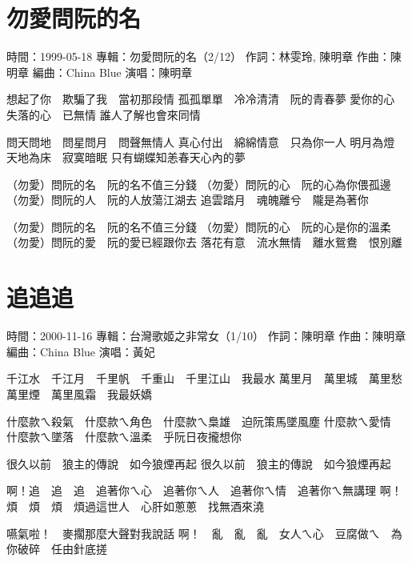\documentclass[UTF8,a4paper,oneside,twocolumn,12pt]{ctexbook}
\newcommand{\infopair}[2]{\textbullet #1：#2}
\newcommand{\zc}[1][伍佰]{\infopair{作詞}{#1}}
\newcommand{\zq}[1][伍佰]{\infopair{作曲}{#1}}
\newcommand{\bq}[1][伍佰]{\infopair{編曲}{#1}}
\newcommand{\zj}[1]{\infopair{專輯}{#1}}
\newcommand{\sj}[1]{\infopair{時間}{#1}}
\newenvironment{info}{\begin{flushleft}\kaishu
	}
	{\end{flushleft}\normalsize\yahei\par}
\newenvironment{lyric}{
	}
{}
\begin{document}
\section{勿愛問阮的名}
\begin{info}
	\sj{1999-05-18}
	\zj{勿愛問阮的名（2/12）}
	\zc[林雯玲, 陳明章]
	\zq[陳明章]
	\bq[China Blue]
	\infopair{演唱}{陳明章}
\end{info}
\begin{lyric}
	想起了你　欺騙了我　當初那段情
	孤孤單單　冷冷清清　阮的青春夢
	愛你的心　失落的心　已無情
	誰人了解也會來同情

	問天問地　問星問月　問聲無情人
	真心付出　綿綿情意　只為你一人
	明月為燈　天地為床　寂寞暗眠
	只有蝴蝶知恙春天心內的夢

	（勿愛）問阮的名　阮的名不值三分錢
	（勿愛）問阮的心　阮的心為你偎孤邊
	（勿愛）問阮的人　阮的人放蕩江湖去
	追雲踏月　魂魄離兮　隴是為著你

	（勿愛）問阮的名　阮的名不值三分錢
	（勿愛）問阮的心　阮的心是你的溫柔
	（勿愛）問阮的愛　阮的愛已經跟你去
	落花有意　流水無情　離水鴛鴦　恨別離
\end{lyric}

\section{追追追}
\begin{info}
	\sj{2000-11-16}
	\zj{台灣歌姬之非常女（1/10）}
	\zc[陳明章]
	\zq[陳明章]
	\bq[China Blue]
	\infopair{演唱}{黃妃}
\end{info}
\begin{lyric}
	千江水　千江月　千里帆　千重山　千里江山　我最水
	萬里月　萬里城　萬里愁　萬里煙　萬里風霜　我最妖嬌

	什麼款ㄟ殺氣　什麼款ㄟ角色　什麼款ㄟ梟雄　迫阮策馬墜風塵
	什麼款ㄟ愛情　什麼款ㄟ墜落　什麼款ㄟ溫柔　乎阮日夜攏想你

	很久以前　狼主的傳說　如今狼煙再起
	很久以前　狼主的傳說　如今狼煙再起

	啊！追　追　追　追著你ㄟ心　追著你ㄟ人　追著你ㄟ情　追著你ㄟ無講理
	啊！煩　煩　煩　煩過這世人　心肝如蔥蔥　找無酒來澆

	嚥氣啦！　麥擱那麼大聲對我說話
	啊！　亂　亂　亂　女人ㄟ心　豆腐做ㄟ　為你破碎　任由針底搓
\end{lyric}
\end{document}
